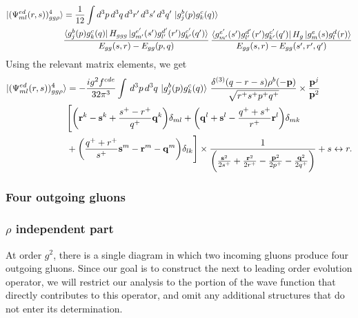 \documentclass[a4paper,11pt]{article}
\def\v#1{\mathbf{#1}}
\begin{document}
\begin{figure}[htbp]
    \centering
    \label{fig:enter-label}
\end{figure}
\begin{align}
    \ket{(\Psi^{ed}_{ml}(r,s))^{4}_{gg\rho}} & = \frac{1}{12}\int d^{3}p\, d^{3}q\, d^{3}r^{\prime}\,d^{3}s^{\prime} \,d^{3}q^{\prime}\,\ket{g^{b}_{j}(p)g^{c}_{k}(q)}\notag \\  & \frac{\bra{g^{b}_{j}(p)g^{c}_{k}(q)}H_{ggg}\ket{g^{e^{\prime}}_{m^{\prime}}(s^{\prime})g^{d^{\prime}}_{l^{\prime}}(r^{\prime})g^{c^{\prime}}_{k^{\prime}}(q^{\prime})}}{E_{gg}(s,r)-E_{gg}(p,q)}\,\frac{\bra{g^{e^{\prime}}_{m^{\prime}}(s^{\prime})g^{d^{\prime}}_{l^{\prime}}(r^{\prime})g^{c^{\prime}}_{k^{\prime}}(q^{\prime})}H_{g}\ket{g^{e}_{m}(s)g^{d}_{l}(r)}}{E_{gg}(s,r)-E_{gg}(s^{\prime},r^{\prime},q^{\prime})}  
\end{align}
Using the relevant matrix elements, we get
\begin{align}
    \ket{(\Psi^{ed}_{ml}(r,s))^{4}_{gg\rho}} & =  -\frac{ig^{2}f^{cde}}{32\pi^{3}}\int\, d^{3}p \, d^{3}q\, \ket{g^{b}_{j}(p)g^{c}_{k}(q)}\, \frac{\delta^{(3)}(q-r-s)\rho^{b}(\v{-p})}{\sqrt{r^{+}s^{+}p^{+}q^{+}}}\times \frac{\v{p}^{j}}{\v{p}^{2}}\notag \\ & \Bigg[\bigg(\v{r}^{k}-\v{s}^{k}+\frac{s^{+}-r^{+}}{q^{+}}  \v{q}^{k}\bigg)\delta_{ml} +\bigg(\v{q}^{l}+\v{s}^{l}-\frac{q^{+}+s^{+}}{r^{+}}\v{r}^{l}\bigg)\delta_{mk}\notag \\ & +\bigg(\frac{q^{+}+r^{+}}{s^{+}}\v{s}^{m}-\v{r}^{m}-\v{q}^{m}\bigg)\delta_{lk}\Bigg] \times \frac{1}{\bigg(\frac{\v{s}^{2}}{2s^{+}}+\frac{\v{r}^{2}}{2r^{+}}-\frac{\v{p}^{2}}{2p^{+}}-\frac{\v{q}^{2}}{2q^{+}}\bigg)} + s\leftrightarrow r.
\end{align}

\subsubsection{Four outgoing gluons}

\subsubsection*{$\rho$ independent part}
At order $g^{2}$, there is a single diagram in which two incoming gluons produce four outgoing gluons. Since our goal is to construct the next to leading order evolution operator, we will restrict our analysis to the portion of the wave function that directly contributes to this operator, and omit any additional structures that do not enter its determination.
\end{document}
